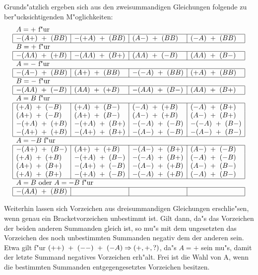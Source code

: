 Grunds"atzlich ergeben sich aus den zweisummandigen Gleichungen folgende zu
be\-r"ucksichtigenden M"oglichkeiten:
{\small
$$
\begin{array}{|l|l|l|l|}
\multicolumn{4}{l}{A=+ \mbox{ f"ur }} \\
\hline
-(A+)~+~(BB) & -(+A)~+~(BB) & (A-)~+~(BB) & (-A)~+~(BB) \\
\hline
\multicolumn{4}{l}{B=+ \mbox{ f"ur }} \\
\hline
-(AA)~+~(+B) & -(AA)~+~(B+) & (AA)~+~(-B) & (AA)~+~(B-) \\
\hline
\multicolumn{4}{l}{A=- \mbox{ f"ur }} \\
\hline
-(A-)~+~(BB) & (A+)~+~(BB) & -(-A)~+~(BB) & (+A)~+~(BB) \\
\hline
\multicolumn{4}{l}{B=- \mbox{ f"ur }} \\
\hline
-(AA)~+~(-B) & (AA)~+~(+B) & -(AA)~+~(B-) & (AA)~+~(B+) \\
\hline
\multicolumn{4}{l}{A=B \mbox{ f"ur }} \\
\hline
 (+A)~+~(-B) &  (+A)~+~(B-) &  (-A)~+~(+B) &  (-A)~+~(B+) \\
 (A+)~+~(-B) &  (A+)~+~(B-) &  (A-)~+~(+B) &  (A-)~+~(B+) \\
-(+A)~+~(+B) & -(+A)~+~(B+) & -(-A)~+~(-B) & -(-A)~+~(B-) \\
-(A+)~+~(+B) & -(A+)~+~(B+) & -(A-)~+~(-B) & -(A-)~+~(B-) \\
\hline
\multicolumn{4}{l}{A=-B \mbox{ f"ur }} \\
\hline
-(A+)~+~(B-) &  (A+)~+~(+B) & -(A-)~+~(B+) &  (A-)~+~(-B) \\
 (+A)~+~(+B) & -(+A)~+~(B-) & -(-A)~+~(B+) &  (-A)~+~(-B) \\
 (A+)~+~(B+) & -(A+)~+~(-B) & -(A-)~+~(+B) &  (A-)~+~(B-) \\
 (+A)~+~(B+) & -(+A)~+~(-B) & -(-A)~+~(+B) &  (-A)~+~(B-) \\
\hline
\multicolumn{4}{l}{A=B \mbox{ oder } A=-B \mbox{ f"ur }} \\
\hline
-(AA)~+~(BB) & & & \\
\hline
\end{array}
$$}

Weiterhin lassen sich Vorzeichen aus dreisummandigen Gleichungen erschlie"sen,
wenn genau ein Bracketvorzeichen unbestimmt ist. Gilt dann, da"s das Vorzeichen
der beiden anderen Summanden gleich ist, so mu"s mit dem ungesetzten das
Vorzeichen des noch unbestimmten Summanden negativ dem der anderen sein.
Etwa gilt f"ur $(++)~+~(--)~+~(-A)\Rightarrow (+,+,?)$, da"s $A=+$ sein mu"s, damit
der letzte Summand negatives Vorzeichen erh"alt. Frei ist die Wahl von A, wenn
die bestimmten Summanden entgegengesetztes Vorzeichen besitzen.

